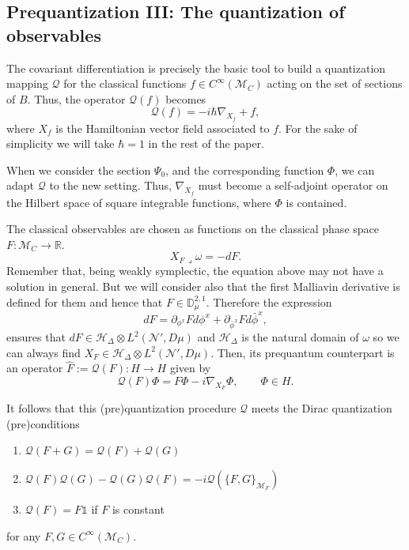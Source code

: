 \documentclass[12pt]{article}%
\begin{document}
\subsection{Prequantization III: The quantization of observables}
The covariant differentiation is precisely the basic tool to build a quantization mapping $\mathcal{Q}$ for the classical functions $f\in C^\infty(\mathcal{M}_C)$ acting on the set of sections of $B$. Thus, the operator $\mathcal{Q}(f)$  becomes
\begin{equation}
\label{eq:quantization}
\mathcal{Q}(f)=-i\hbar \nabla_{X_f} +f,
\end{equation}
where $X_f$ is the Hamiltonian vector field associated to $f$. For the sake of simplicity we will take $\hbar=1$ in the rest of the paper.

When we consider the section $\Psi_0$, and the corresponding function $\Phi$, we can adapt $\mathcal{Q}$ to the new setting. Thus,  $\nabla_{X_f}$ must become a self-adjoint operator on the Hilbert space of square integrable functions, where  $\Phi$ is contained. 

The classical observables are chosen as functions on the classical phase space $F:\mathcal{M}_C \to \mathbb{R}$. 
\begin{equation}
\label{eq:Hamiltonina}
X_{F}\lrcorner \omega =-dF.
\end{equation} 
Remember that, being weakly symplectic, the equation above may not have a solution in general. 
But we will consider also that the first Malliavin derivative is defined for them and hence that $F\in\mathbb{D}_{\mu}^{2,1}$.   Therefore the expression
$$dF= \partial_{\phi^{x}}Fd\phi^x+\partial_{\bar\phi^{x}}Fd\bar\phi^x,$$
ensures that $dF\in \mathcal{H}_\Delta\otimes L^2(\mathcal{N}',D\mu) $ and $\mathcal{H}_\Delta$ is the natural domain of $\omega$ so we can always find $X_F\in \mathcal{H}_\Delta\otimes L^2(\mathcal{N}',D\mu)$. 
Then, its prequantum counterpart is an operator $\hat{F}:=\mathcal{Q}(F):H\to H$ given by 
\begin{equation}
\label{eq:actionPrecuantumOperator}
\mathcal{Q}(F) \Phi= F\Phi-i\nabla_{X_{F}}\Phi, \qquad \Phi\in H.
\end{equation}


It follows that this (pre)quantization procedure $\mathcal{Q}$  meets the Dirac quantization (pre)conditions \cite{hall2013}
\begin{enumerate}[label=Q\arabic*)]
    \item $\mathcal{Q}(F+G)=\mathcal{Q}({F})+\mathcal{Q}({G})$ 
    \item $\mathcal{Q}({F})\mathcal{Q}({G})-\mathcal{Q}({G})\mathcal{Q}({F})=-i\mathcal{Q}(\{F,G\}_{\mathcal{M}_F})$
    \item $\mathcal{Q}(F)=F\mathds{1}$ if $F$ is constant
\end{enumerate}
for any $F, G\in C^\infty(\mathcal{M}_C)$.
\end{document}
